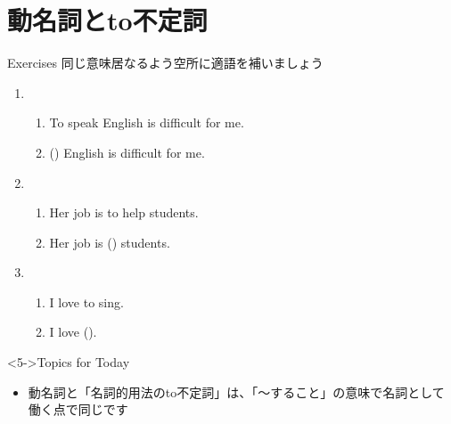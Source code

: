 \documentclass[aspectratio=169,xcolor={dvipsnames,table}]{beamer}
\begin{document}
\section{動名詞とto不定詞}
\begin{frame}[plain]{Exercises}
同じ意味居なるよう空所に適語を補いましょう%
\hfill{\scriptsize {}}
\begin{enumerate}
 \item \begin{enumerate}
	\item To speak English is difficult for me.
	\item () English is difficult for me.
       \end{enumerate}
 \item  \begin{enumerate}
	\item Her job is to help students.
	\item Her job is () students.
       \end{enumerate}
 \item \begin{enumerate}
	\item I love to sing.
	\item I love ().
       \end{enumerate}
\end{enumerate}

\begin{exampleblock}<5->{Topics for Today}
\begin{itemize}\small
 \item  動名詞と「名詞的用法のto不定詞」は、「〜すること」の意味で名詞として働く点で同じです
\end{itemize}
     \end{exampleblock}
\end{frame}
\end{document}
